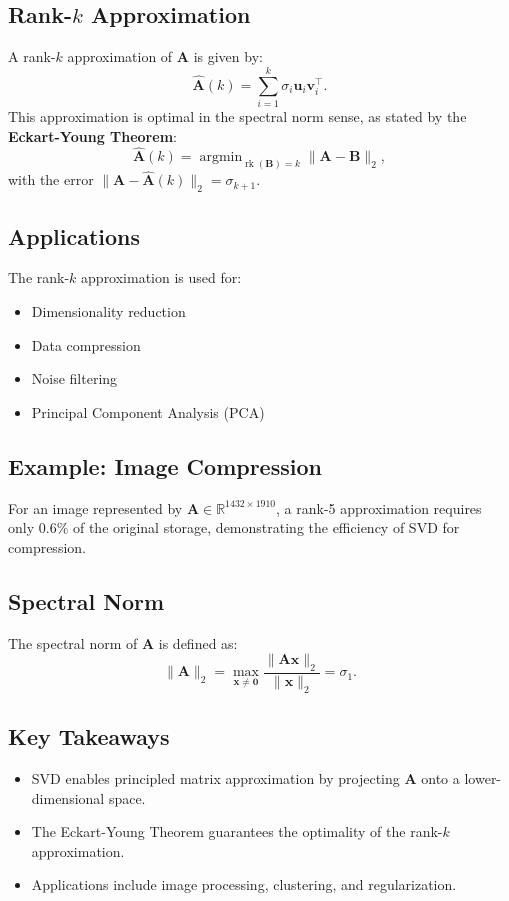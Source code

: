 \subsection{Rank-\(k\) Approximation}
A rank-\(k\) approximation of \(\boldsymbol{A}\) is given by:
\[
\widehat{\boldsymbol{A}}(k) = \sum_{i=1}^k \sigma_i \boldsymbol{u}_i \boldsymbol{v}_i^\top.
\]
This approximation is optimal in the spectral norm sense, as stated by the \textbf{Eckart-Young Theorem}:
\[
\widehat{\boldsymbol{A}}(k) = \operatorname{argmin}_{\operatorname{rk}(\boldsymbol{B}) = k} \|\boldsymbol{A} - \boldsymbol{B}\|_2,
\]
with the error \(\|\boldsymbol{A} - \widehat{\boldsymbol{A}}(k)\|_2 = \sigma_{k+1}\).

\subsection{Applications}
The rank-\(k\) approximation is used for:
\begin{itemize}
    \item Dimensionality reduction
    \item Data compression
    \item Noise filtering
    \item Principal Component Analysis (PCA)
\end{itemize}

\subsection{Example: Image Compression}
For an image represented by \(\boldsymbol{A} \in \mathbb{R}^{1432 \times 1910}\), a rank-5 approximation requires only \(0.6\%\) of the original storage, demonstrating the efficiency of SVD for compression.

\subsection{Spectral Norm}
The spectral norm of \(\boldsymbol{A}\) is defined as:
\[
\|\boldsymbol{A}\|_2 = \max_{\boldsymbol{x} \neq \mathbf{0}} \frac{\|\boldsymbol{A}\boldsymbol{x}\|_2}{\|\boldsymbol{x}\|_2} = \sigma_1.
\]

\subsection{Key Takeaways}
\begin{itemize}
    \item SVD enables principled matrix approximation by projecting \(\boldsymbol{A}\) onto a lower-dimensional space.
    \item The Eckart-Young Theorem guarantees the optimality of the rank-\(k\) approximation.
    \item Applications include image processing, clustering, and regularization.
\end{itemize}


